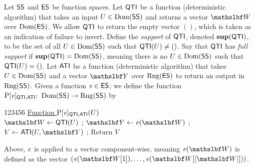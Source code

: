 Let $\mathsf{SS}$ and $\mathsf{ES}$ be function spaces. Let $\mathsf{QTI}$ be a function (deterministic algorithm) that takes an input $U \in \mathrm{Dom}(\mathsf{SS})$ and returns a vector $\vecW$ over $\mathrm{Dom}(\mathsf{ES})$. We allow $\mathsf{QTI}$ to return the empty vector $()$, which is taken as an indication of failure to invert. Define the \textit{support} of $\mathsf{QTI}$, denoted $\mathbf{sup}(\mathsf{QTI})$, to be the set of all $U\in\mathrm{Dom}(\mathsf{SS})$ such that $\mathsf{QTI}(U)\neq ()$. Say that $\mathsf{QTI}$ has \textit{full support} if $\mathbf{sup}(\mathsf{QTI}) = \mathrm{Dom}(\mathsf{SS})$, meaning there is no $U \in \mathrm{Dom}(\mathsf{SS})$ such that $\mathsf{QTI}(U)=()$. Let $\mathsf{ATI}$ be a function (deterministic algorithm) that takes $U\in\mathrm{Dom}(\mathsf{SS})$ and a vector $\vecY$ over $\mathrm{Rng}(\mathsf{ES})$ to return an output in $\mathrm{Rng}(\mathsf{SS})$. Given a function $\mathit{e} \in \mathsf{ES}$, we define the function $\mathrm{P}[\mathit{e}]_{\mathsf{QTI},\mathsf{ATI}} {:\;\;} \mathrm{Dom}(\mathsf{SS})\to\mathrm{Rng}(\mathsf{SS})$ by 
\begin{tabbing}
	123456\=\kill
	\> \underline{Function $\mathrm{P}[\mathit{e}]_{\mathsf{QTI},\mathsf{ATI}}(U)$}  \\[2pt]
	\> $\vecW \gets \QuTInv(U)$ ; $\vecY\gets \aFunc{\functionOut}(\vecW)$ ;
	$V\gets \AnTInv(U,\vecY)$ ; Return $V$
\end{tabbing}
Above, $\mathit{e}$ is applied to a vector component-wise, meaning $\aFunc{\functionOut}(\vecW)$ is defined as the vector $(\aFunc{\functionOut}(\vecW[1]),\allowbreak \ldots,\allowbreak \aFunc{\functionOut}(\vecW[|\vecW|]))$. 

